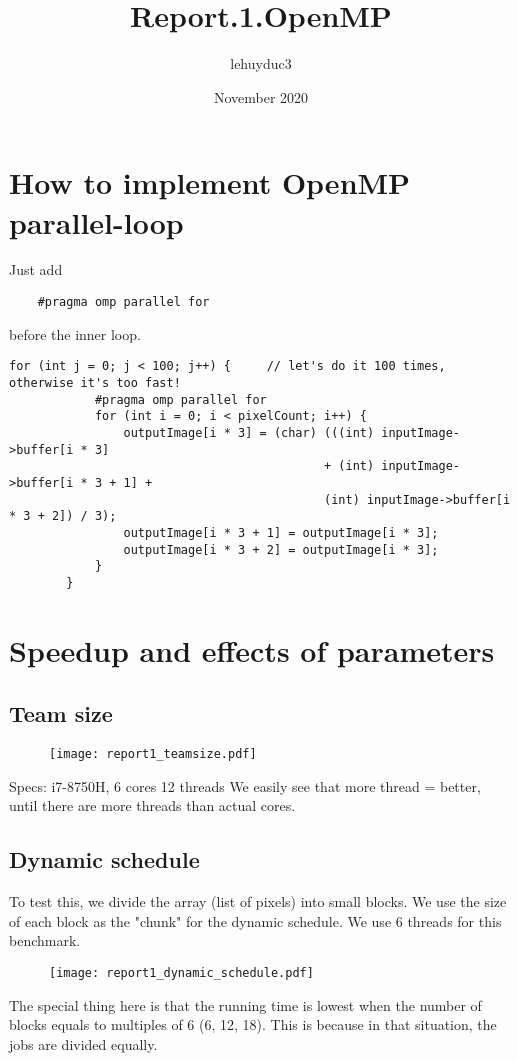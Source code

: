 \documentclass[14pt]{article}
\title{Report.1.OpenMP}
\author{lehuyduc3 }
\date{November 2020}
\begin{document}
\maketitle

\section{How to implement OpenMP parallel-loop}
Just add
\begin{verbatim}
    #pragma omp parallel for
\end{verbatim}
before the inner loop.

\begin{lstlisting}
for (int j = 0; j < 100; j++) {     // let's do it 100 times, otherwise it's too fast!
            #pragma omp parallel for
            for (int i = 0; i < pixelCount; i++) {
                outputImage[i * 3] = (char) (((int) inputImage->buffer[i * 3] 
                                            + (int) inputImage->buffer[i * 3 + 1] +
                                            (int) inputImage->buffer[i * 3 + 2]) / 3);
                outputImage[i * 3 + 1] = outputImage[i * 3];
                outputImage[i * 3 + 2] = outputImage[i * 3];
            }
        }
\end{lstlisting}

\section{Speedup and effects of parameters}
\subsection{Team size}

\begin{figure}[h]
\centering
\texttt{[image: report1\_teamsize.pdf]}
\end{figure}

Specs: i7-8750H, 6 cores 12 threads
We easily see that more thread = better, until there are more threads than actual cores.

\subsection{Dynamic schedule}
To test this, we divide the array (list of pixels) into small blocks. We use the size of each block as the "chunk" for the dynamic schedule. We use 6 threads for this benchmark.

\begin{figure}[h]
\centering
\texttt{[image: report1\_dynamic\_schedule.pdf]}
\end{figure}

The special thing here is that the running time is lowest when the number of blocks equals to multiples of 6 (6, 12, 18). This is because in that situation, the jobs are divided equally.
\end{document}
